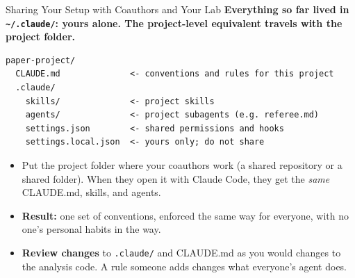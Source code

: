 \documentclass[aspectratio=169, 11pt]{beamer}
\begin{document}
\begin{frame}[fragile]{Sharing Your Setup with Coauthors and Your Lab}
  \textbf{Everything so far lived in \texttt{\textasciitilde/.claude/}: yours alone. The project-level equivalent travels with the project folder.}

  \vspace{0.3em}
  \begin{lstlisting}[basicstyle=\ttfamily\scriptsize]
paper-project/
  CLAUDE.md              <- conventions and rules for this project
  .claude/
    skills/              <- project skills
    agents/              <- project subagents (e.g. referee.md)
    settings.json        <- shared permissions and hooks
    settings.local.json  <- yours only; do not share
  \end{lstlisting}

  \vspace{0.2em}
  \begin{itemize}\small
    \item Put the project folder where your coauthors work (a shared repository or a shared folder). When they open it with Claude Code, they get the \emph{same} CLAUDE.md, skills, and agents.
    \item \textbf{Result:} one set of conventions, enforced the same way for everyone, with no one's personal habits in the way.
    \item \textbf{Review changes} to \texttt{.claude/} and CLAUDE.md as you would changes to the analysis code. A rule someone adds changes what everyone's agent does.
  \end{itemize}
\end{frame}
\end{document}

